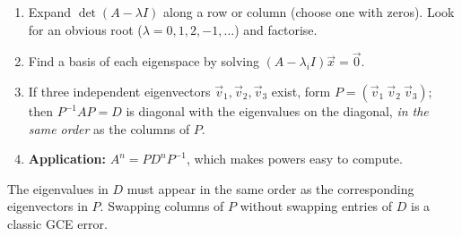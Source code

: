 \documentclass[11pt]{article}
\begin{document}
\begin{methode}
\begin{enumerate}
\item Expand $\det(A-\lambda I)$ along a row or column (choose one with zeros). Look for an obvious root ($\lambda=0,1,2,-1,\dots$) and factorise.
\item Find a basis of each eigenspace by solving $(A-\lambda_i I)\vec{x}=\vec{0}$.
\item If three independent eigenvectors $\vec{v}_1,\vec{v}_2,\vec{v}_3$ exist, form $P=(\vec{v}_1\ \vec{v}_2\ \vec{v}_3)$; then $P^{-1}AP=D$ is diagonal with the eigenvalues on the diagonal, \emph{in the same order} as the columns of $P$.
\item \textbf{Application:} $A^n=PD^nP^{-1}$, which makes powers easy to compute.
\end{enumerate}
\begin{attention}
The eigenvalues in $D$ must appear in the same order as the corresponding eigenvectors in $P$. Swapping columns of $P$ without swapping entries of $D$ is a classic GCE error.
\end{attention}
\end{methode}
\end{document}
